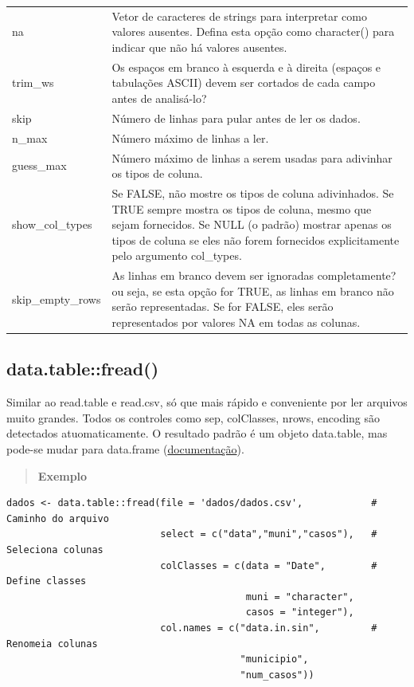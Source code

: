 \documentclass[
]{book}
\theoremstyle{definition}
\theoremstyle{definition}
\theoremstyle{definition}
\theoremstyle{definition}
\theoremstyle{remark}
\begin{document}
\begin{longtable}[]{@{}
  >{\raggedright\arraybackslash}p{}
  >{\raggedright\arraybackslash}p{}@{}}
na & Vetor de caracteres de strings para interpretar como valores ausentes. Defina esta opção como character() para indicar que não há valores ausentes. \\
trim\_ws & Os espaços em branco à esquerda e à direita (espaços e tabulações ASCII) devem ser cortados de cada campo antes de analisá-lo? \\
skip & Número de linhas para pular antes de ler os dados. \\
n\_max & Número máximo de linhas a ler. \\
guess\_max & Número máximo de linhas a serem usadas para adivinhar os tipos de coluna. \\
show\_col\_types & Se FALSE, não mostre os tipos de coluna adivinhados. Se TRUE sempre mostra os tipos de coluna, mesmo que sejam fornecidos. Se NULL (o padrão) mostrar apenas os tipos de coluna se eles não forem fornecidos explicitamente pelo argumento col\_types. \\
skip\_empty\_rows & As linhas em branco devem ser ignoradas completamente? ou seja, se esta opção for TRUE, as linhas em branco não serão representadas. Se for FALSE, eles serão representados por valores NA em todas as colunas. \\
\end{longtable}

\hypertarget{data.tablefread}{%
\subsection{data.table::fread()}\label{data.tablefread}}

Similar ao read.table e read.csv, só que mais rápido e conveniente por ler arquivos muito grandes. Todos os controles como sep, colClasses, nrows, encoding são detectados atuomaticamente. O resultado padrão é um objeto data.table, mas pode-se mudar para data.frame (\href{https://www.rdocumentation.org/packages/data.table/versions/1.14.2/topics/fread}{documentação}).

\begin{quote}
\textbf{Exemplo}
\end{quote}

\begin{verbatim}
dados <- data.table::fread(file = 'dados/dados.csv',            # Caminho do arquivo
                           select = c("data","muni","casos"),   # Seleciona colunas
                           colClasses = c(data = "Date",        # Define classes
                                          muni = "character",
                                          casos = "integer"),
                           col.names = c("data.in.sin",         # Renomeia colunas
                                         "municipio", 
                                         "num_casos")) 
\end{verbatim}
\end{document}
